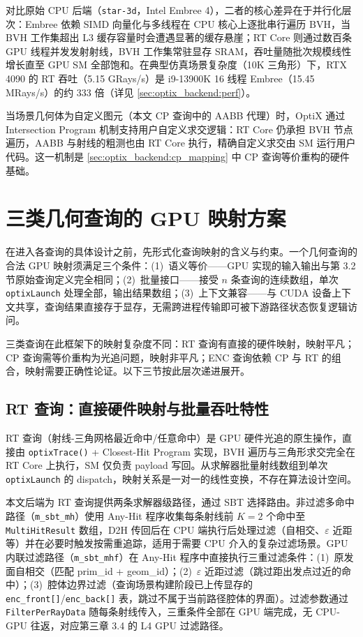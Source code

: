 对比原始 CPU 后端（\texttt{star-3d}，Intel Embree 4），二者的核心差异在于并行化层次：Embree 依赖 SIMD 向量化与多线程在 CPU 核心上逐批串行遍历 BVH，当 BVH 工作集超出 L3 缓存容量时会遭遇显著的缓存悬崖；RT Core 则通过数百条 GPU 线程并发发射射线，BVH 工作集常驻显存 SRAM，吞吐量随批次规模线性增长直至 GPU SM 全部饱和。在典型仿真场景复杂度（10K 三角形）下，RTX 4090 的 RT 吞吐（5.15 GRays/s）是 i9-13900K 16 线程 Embree（15.45 MRays/s）的约 333 倍（详见 \ref{sec:optix_backend:perf}）。

当场景几何体为自定义图元（本文 CP 查询中的 AABB 代理）时，OptiX 通过 Intersection Program 机制支持用户自定义求交逻辑：RT Core 仍承担 BVH 节点遍历，AABB 与射线的粗测也由 RT Core 执行，精确自定义求交由 SM 运行用户代码。这一机制是 \ref{sec:optix_backend:cp_mapping} 中 CP 查询等价重构的硬件基础。

\section{三类几何查询的 GPU 映射方案}
\label{sec:optix_backend:query_mapping}

在进入各查询的具体设计之前，先形式化查询映射的含义与约束。一个几何查询的合法 GPU 映射须满足三个条件：(1)~语义等价——GPU 实现的输入输出与第 3.2 节原始查询定义完全相同；(2)~批量接口——接受 $n$ 条查询的连续数组，单次 \texttt{optixLaunch} 处理全部，输出结果数组；(3)~上下文兼容——与 CUDA 设备上下文共享，查询结果直接存于显存，无需跨进程传输即可被下游路径状态恢复逻辑访问。

三类查询在此框架下的映射复杂度不同：RT 查询有直接的硬件映射，映射平凡；CP 查询需等价重构为光追问题，映射非平凡；ENC 查询依赖 CP 与 RT 的组合，映射需要正确性论证。以下三节按此层次递进展开。

\subsection{RT 查询：直接硬件映射与批量吞吐特性}
\label{sec:optix_backend:rt_mapping}

RT 查询（射线-三角网格最近命中/任意命中）是 GPU 硬件光追的原生操作，直接由 \texttt{optixTrace()} + Closest-Hit Program 实现，BVH 遍历与三角形求交完全在 RT Core 上执行，SM 仅负责 payload 写回。从求解器批量射线数组到单次 \texttt{optixLaunch} 的 dispatch，映射关系是一对一的线性变换，不存在算法设计空间。

本文后端为 RT 查询提供两条求解器级路径，通过 SBT 选择路由。非过滤多命中路径（\texttt{m\_sbt\_mh}）使用 Any-Hit 程序收集每条射线前 $K=2$ 个命中至 \texttt{MultiHitResult} 数组，D2H 传回后在 CPU 端执行后处理过滤（自相交、$\varepsilon$ 近距等）并在必要时触发按需重追踪，适用于需要 CPU 介入的复杂过滤场景。GPU 内联过滤路径（\texttt{m\_sbt\_mhf}）在 Any-Hit 程序中直接执行三重过滤条件：(1)~原发面自相交（匹配 prim\_id + geom\_id）；(2)~$\varepsilon$ 近距过滤（跳过距出发点过近的命中）；(3)~腔体边界过滤（查询场景构建阶段已上传显存的 \texttt{enc\_front[]}/\texttt{enc\_back[]} 表，跳过不属于当前路径腔体的界面）。过滤参数通过 \texttt{FilterPerRayData} 随每条射线传入，三重条件全部在 GPU 端完成，无 CPU-GPU 往返，对应第三章 3.4 的 L4 GPU 过滤路径。

